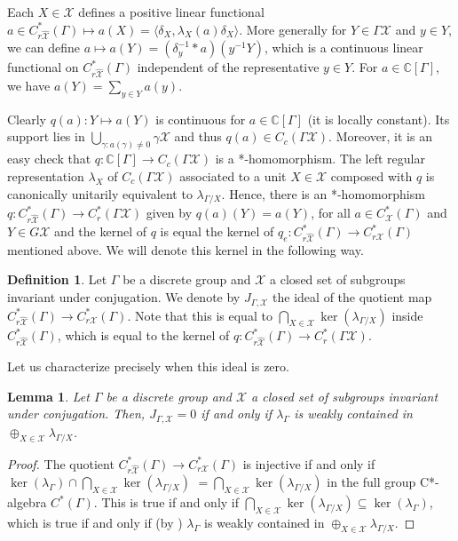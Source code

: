 \documentclass[a4paper, 12pt]{amsart}
\newtheorem{lem}[thm]{Lemma}
\theoremstyle{definition}
\newtheorem{dfn}[thm]{Definition}
\theoremstyle{remark}
\numberwithin{equation}{section}
\begin{document}
Each $X\in \mathcal{X}$ defines a positive linear functional $a\in C^{*}_{r\hat{\mathcal{X}}}(\Gamma)\mapsto a(X) = \langle \delta_{X},\lambda_{X}(a)\delta_{X}\rangle$. More generally for $Y\in \Gamma\mathcal{X}$ and $y\in Y$, we can define $a\mapsto a(Y) = (\delta_{y}^{-1}*a)(y^{-1}Y)$, which is a continuous linear functional on $C^{*}_{r\hat{\mathcal{X}}}(\Gamma)$ independent of the representative $y\in Y$. For $a\in \mathbb{C}[\Gamma]$, we have $a(Y) = \sum_{y\in Y}a(y)$.

Clearly $q(a):Y\mapsto a(Y)$ is continuous for $a\in\mathbb{C}[\Gamma]$ (it is locally constant). Its support lies in $\bigcup_{\gamma:a(\gamma)\neq 0}\gamma\mathcal{X}$ and thus $q(a)\in C_{c}(\Gamma\mathcal{X})$. Moreover, it is an easy check that  $q: \mathbb{C}[\Gamma]\to C_{c}(\Gamma\mathcal{X})$ is a *-homomorphism. The left regular representation $\lambda_{X}$ of $C_{c}(\Gamma\mathcal{X})$ associated to a unit $X\in\mathcal{X}$ composed with $q$ is canonically unitarily equivalent to $\lambda_{\Gamma/X}$. Hence, there is an *-homomorphism $q:C^{*}_{r\hat{\mathcal{X}}}(\Gamma)\to C^{*}_{r}(\Gamma\mathcal{X})$ given by $q(a)(Y) = a(Y)$, for all $a\in C^{*}_{\mathcal{X}}(\Gamma)$ and $Y\in G\mathcal{X}$ and the kernel of $q$ is equal the kernel of $q_{e}: C^{*}_{r\hat{\mathcal{X}}}(\Gamma)\to C^{*}_{r\mathcal{X}}(\Gamma)$ mentioned above. We will denote this kernel in the following way.

\begin{dfn}
\label{dfn:gpideal}
    Let $\Gamma$ be a discrete group and $\mathcal{X}$ a closed set of subgroups invariant under conjugation. We denote by $J_{\Gamma,\mathcal{X}}$ the ideal of the quotient map $C^{*}_{r\hat{\mathcal{X}}}(\Gamma)\to C^{*}_{r\mathcal{X}}(\Gamma)$. Note that this is equal to $\bigcap_{X\in\mathcal{X}}\ker(\lambda_{\Gamma/X})$ inside $C^{*}_{r\hat{\mathcal{X}}}(\Gamma)$, which is equal to the kernel of $q:C^{*}_{r\hat{\mathcal{X}}}(\Gamma)\to C^{*}_{r}(\Gamma\mathcal{X})$.
\end{dfn}
Let us characterize precisely when this ideal is zero.

\begin{lem}
\label{lem:groupidealchar}
    Let $\Gamma$ be a discrete group and $\mathcal{X}$ a closed set of subgroups invariant under conjugation. Then, $J_{\Gamma,\mathcal{X}} = 0$ if and only if $\lambda_{\Gamma}$ is weakly contained in $\oplus_{X\in\mathcal{X}}\lambda_{\Gamma/X}$.
\end{lem}
\begin{proof}
    The quotient $C^{*}_{r\hat{\mathcal{X}}}(\Gamma)\to C^{*}_{r\mathcal{X}}(\Gamma)$ is injective if and only if $\ker(\lambda_{\Gamma})\cap \bigcap_{X\in\mathcal{X}} \ker(\lambda_{\Gamma/X})$ $ = \bigcap_{X\in\mathcal{X}} \ker(\lambda_{\Gamma/X})$ in the full group C*-algebra $C^{*}(\Gamma)$. This is true if and only if $\bigcap_{X\in\mathcal{X}} \ker(\lambda_{\Gamma/X})\subseteq \ker(\lambda_{\Gamma})$, which is true if and only if (by \cite[Theorem~F.4.4]{BHV07}) $\lambda_{\Gamma}$ is weakly contained in $\oplus_{X\in\mathcal{X}}\lambda_{\Gamma/X}$.
\end{proof}
\end{document}
